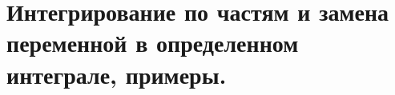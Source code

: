\documentclass[../main.tex]{subfiles}
\begin{document}
\newpage
\section{Интегрирование по частям и замена переменной в определенном интеграле, примеры.}
\end{document}
